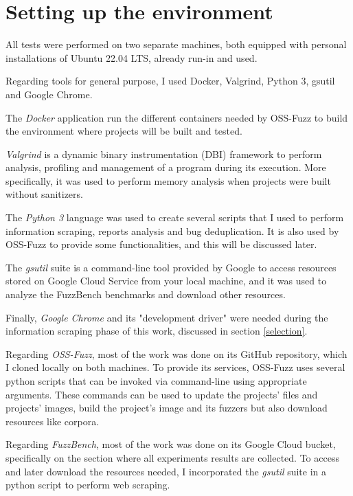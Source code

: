 \newpage
\section{Setting up the environment}
All tests were performed on two separate machines, both equipped with personal installations of Ubuntu 22.04 LTS, already run-in and used.


Regarding tools for general purpose, I used Docker, Valgrind, Python 3, gsutil and Google Chrome.

The \textit{Docker} \cite{Docker} application run the different containers needed by OSS-Fuzz to build the environment where projects will be built and tested.

\textit{Valgrind} \cite{Valgrind_1}\cite{Valgrind_2} is a dynamic binary instrumentation (DBI) framework to perform analysis, profiling and management of a program during its execution.
More specifically, it was used to perform memory analysis when projects were built without sanitizers.

The \textit{Python 3} language was used to create several scripts that I used to perform information scraping, reports analysis and bug deduplication.
It is also used by OSS-Fuzz to provide some functionalities, and this will be discussed later. 

The \textit{gsutil} suite is a command-line tool provided by Google to access resources stored on Google Cloud Service from your local machine, and it was used to analyze the FuzzBench benchmarks and download other resources.

Finally, \textit{Google Chrome} and its "development driver" were needed during the information scraping phase of this work, discussed in section \ref{selection}.


Regarding \textit{OSS-Fuzz}, most of the work was done on its GitHub repository, which I cloned locally on both machines.
To provide its services, OSS-Fuzz uses several python scripts that can be invoked via command-line using appropriate arguments. These commands can be used to update the projects' files and projects' images, build the project's image and its fuzzers but also download resources like corpora. 


Regarding \textit{FuzzBench}, most of the work was done on its Google Cloud bucket, specifically on the section where all experiments results are collected.
To access and later download the resources needed, I incorporated the \textit{gsutil} suite in a python script to perform web scraping.

